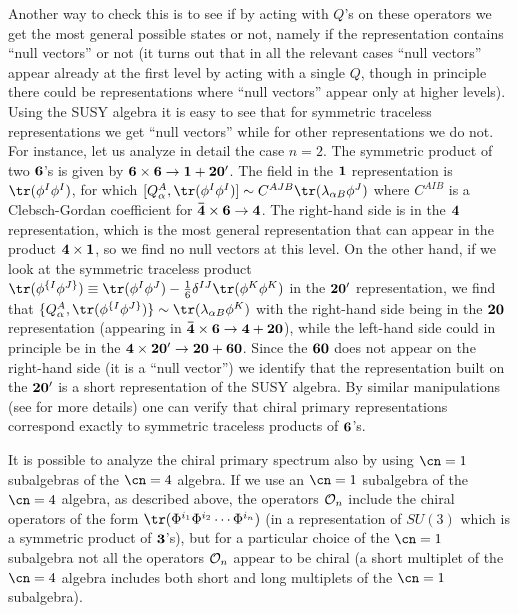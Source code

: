 Another way to check this is to see if by acting with $Q$'s on these
operators we get the most general possible states or not, namely if
the representation contains ``null vectors'' or not (it turns out that
in all the relevant cases ``null vectors'' appear already at the first
level by acting with a single $Q$, though in principle there could be
representations where ``null vectors'' appear only at higher
levels). Using the SUSY algebra  it is easy to see
that for symmetric traceless representations we get ``null vectors''
while for other representations we do not. For instance, let us
analyze in detail the case $n=2$. The symmetric product of two $\bf
6$'s is given by $\bf{6\times 6 \to 1 + 20'}$. The field in the $\bf
1$ representation is $\tr(\phi^I \phi^I)$, for which $[Q_\alpha^A,
\tr(\phi^I \phi^I)] \sim C^{AJB} \tr(\lambda_{\alpha B} \phi^J)$ where
$C^{AIB}$ is a Clebsch-Gordan coefficient for ${\bf {\bar 4}\times 6
\to 4}$. The right-hand side is in the $\bf 4$ representation, which is
the most general representation that can appear in the product
$\bf{4\times 1}$, so we find no null vectors at this level. On the
other hand, if we look at the symmetric traceless product
$\tr(\phi^{\{I} \phi^{J\}})\equiv \tr(\phi^I \phi^J) - {1\over 6}
\delta^{IJ} \tr(\phi^K \phi^K)$ in the ${\bf 20'}$ representation, we
find that $\{Q_{\alpha}^A, \tr(\phi^{\{I} \phi^{J\}}) \} \sim
\tr(\lambda_{\alpha B} \phi^K)$ with the right-hand side being in the
$\bf 20$ representation (appearing in $\bf{{\bar 4}\times 6 \to 4 +
20}$), while the left-hand side could in principle be in the
$\bf{4\times 20' \to 20+60}$. Since the $\bf 60$ does not appear on
the right-hand side (it is a ``null vector'') we identify that the
representation built on the $\bf 20'$ is a short representation of the
SUSY algebra. By similar manipulations (see \cite{Witten:1998qj,
Ferrara:1998ej,Andrianopoli:1998jh,Gunaydin:1998sw} for more details)
one can verify that chiral primary representations correspond exactly
to symmetric traceless products of $\bf 6$'s.

It is possible to analyze the chiral primary spectrum also
by using $\cn=1$ subalgebras of the $\cn=4$ algebra. If we use an
$\cn=1$ subalgebra of the $\cn=4$ algebra, as described above, the
operators ${\cal O}_n$ include the chiral operators of the form
$\tr(\Phi^{i_1} \Phi^{i_2} \cdots \Phi^{i_n})$ (in a representation of
$SU(3)$ which is a symmetric product of $\bf 3$'s), but for a
particular choice of the $\cn=1$ subalgebra not all the operators
${\cal O}_n$ appear to be chiral (a short multiplet of the $\cn=4$
algebra includes both short and long multiplets of the $\cn=1$
subalgebra).

